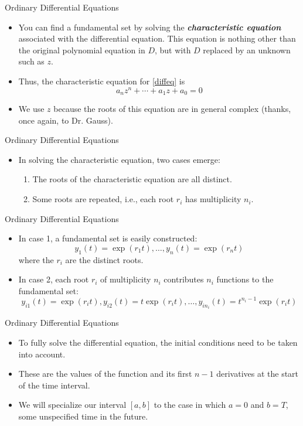 \begin{frame}
Ordinary Differential Equations
 \begin{itemize}
 \item You can find a fundamental set by solving the
 \textit{\textbf{characteristic equation}} associated with the differential equation.  This equation is
 nothing other than the original polynomial equation in $D$, but
 with $D$ replaced by an unknown such as $z$.
 \item Thus, the characteristic equation for \eqref{diffeq} is
 \[a_nz^n+\cdots + a_1z + a_0=0\]
 \item We use $z$ because the roots of this equation are in
 general complex (thanks, once again, to Dr. Gauss).
\end{itemize}
\end{frame}
\begin{frame}
Ordinary Differential Equations
 \begin{itemize}
 \item In solving the characteristic equation, two cases emerge:
 \begin{enumerate}
 \item The roots of the characteristic equation are all distinct.
 \item Some roots are repeated, i.e., each root $r_i$ has
 multiplicity $n_i$.
 \end{enumerate}
\end{itemize}
\end{frame}
\begin{frame}
Ordinary Differential Equations
 \begin{itemize}
 \item In case 1, a fundamental set is easily constructed:
 \[y_1(t)=\exp(r_1t),\ldots,y_n(t)=\exp(r_nt) \]
 where the $r_i$ are the distinct roots.
 \item In case 2, each root $r_i$ of multiplicity $n_i$ contributes
 $n_i$ functions to the fundamental set:
 \[y_{i1}(t)=\exp(r_it),y_{i2}(t)=t\exp(r_it),\ldots,y_{in_i}(t)=t^{n_i-1}\exp(r_it) \]
\end{itemize}
\end{frame}
\begin{frame}
Ordinary Differential Equations
 \begin{itemize}
 \item To fully solve the differential equation, the initial
 conditions need to be taken into account.
 \item These are the values of the function and its first $n-1$
 derivatives at the start of the time interval.
 \item We will specialize our interval $[a,b]$ to the case in which $a=0$
 and $b=T$, some unspecified time in the future.
\end{itemize}
\end{frame}
